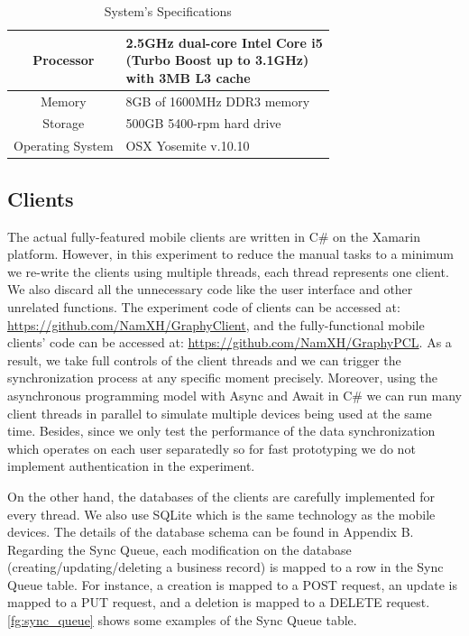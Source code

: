 \begin{table}[!ht]
\centering
\caption{System's Specifications}\label{tb:specs}
\begin{tabular}{ | c | l | }
\hline
	Processor & \specialcell{2.5GHz dual-core Intel Core i5\\(Turbo Boost up to 3.1GHz)\\with 3MB L3 cache} \\ \hline
	Memory & 8GB of 1600MHz DDR3 memory \\ \hline
	Storage & 500GB 5400-rpm hard drive \\ \hline
	Operating System & OSX Yosemite v.10.10\\ \hline
\end{tabular}
\end{table}

\subsection{Clients}
The actual fully-featured mobile clients are written in C\# on the Xamarin platform. However, in this experiment to reduce the manual tasks to a minimum we re-write the clients using multiple threads, each thread represents one client. We also discard all the unnecessary code like the user interface and other unrelated functions. The experiment code of clients can be accessed at: \url{https://github.com/NamXH/GraphyClient}, and the fully-functional mobile clients' code can be accessed at: \url{https://github.com/NamXH/GraphyPCL}. As a result, we take full controls of the client threads and we can trigger the synchronization process at any specific moment precisely. Moreover, using the asynchronous programming model with Async and Await in C\# we can run many client threads in parallel to simulate multiple devices being used at the same time. Besides, since we only test the performance of the data synchronization which operates on each user separatedly so for fast prototyping we do not implement authentication in the experiment.

On the other hand, the databases of the clients are carefully implemented for every thread. We also use SQLite which is the same technology as the mobile devices. The details of the database schema can be found in Appendix B. Regarding the Sync Queue, each modification on the database (creating/updating/deleting a business record) is mapped to a row in the Sync Queue table. For instance, a creation is mapped to a POST request, an update is mapped to a PUT request, and a deletion is mapped to a DELETE request. \autoref{fg:sync_queue} shows some examples of the Sync Queue table.

